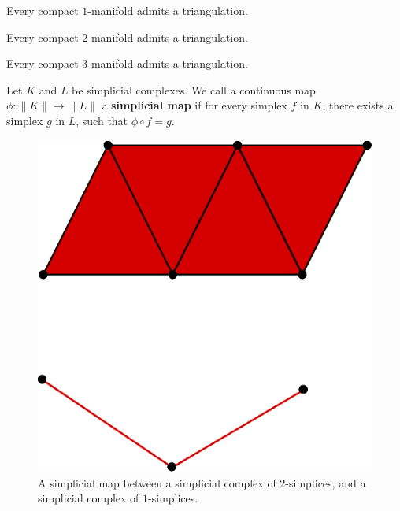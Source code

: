 \begin{theorem}\label{1.4.2}
    Every compact $1$-manifold admits a triangulation.
\end{theorem}

\begin{theorem}\label{1.4.3}
    Every compact $2$-manifold admits a triangulation.
\end{theorem}

\begin{theorem}\label{1.4.4}
    Every compact $3$-manifold admits a triangulation.
\end{theorem}

\begin{definition}
    Let $K$ and  $L$ be simplicial complexes. We call a continuous map
    $\phi:\|K\| \xrightarrow{} \|L\|$ a \textbf{simplicial map} if for every
    simplex $f$ in $K$, there exists  a simplex $g$ in  $L$, such that  $\phi
    \circ f=g$.
\end{definition}

\begin{figure}[h]
    \centering
    \includegraphics[scale=0.5]{Figures/chapter1/simplicial_map.eps}
    \caption{A simplicial map between a simplicial complex of $2$-simplices, and
    a simplicial complex of  $1$-simplices.}
    \label{figure_1.12}
\end{figure}

